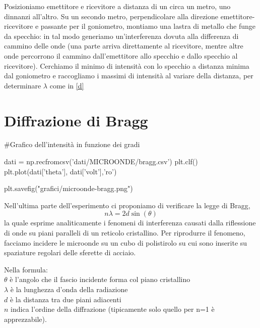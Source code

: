 Posizioniamo emettitore e ricevitore a distanza di un circa un metro, uno dinnanzi all'altro. Su un secondo metro, perpendicolare alla direzione emettitore-ricevitore e passante per il goniometro, montiamo una lastra di metallo che funge da specchio: in tal modo generiamo un'interferenza dovuta alla differenza di cammino delle onde (una parte arriva direttamente al ricevitore, mentre altre onde percorrono il cammino dall'emettitore allo specchio e dallo specchio al ricevitore). Cerchiamo il minimo di intensità con lo specchio a distanza minima dal goniometro e raccogliamo i massimi di intensità al variare della distanza, per determinare $\lambda$ come in \ref{d}

\begin{center}
\end{center}

\section{Diffrazione di Bragg}

\begin{sagesilent}
#Grafico dell'intensità in funzione dei gradi

dati = np.recfromcsv('dati/MICROONDE/bragg.csv')
plt.clf()
plt.plot(dati['theta'], dati['volt'],'ro')

plt.savefig("grafici/microonde-bragg.png")

\end{sagesilent}


Nell'ultima parte dell'esperimento ci proponiamo di verificare la legge di Bragg, 
\begin{equation}
n \lambda = 2 d \sin(\theta)
\end{equation}
la quale esprime analiticamente i fenomeni di interferenza causati dalla riflessione di onde su piani paralleli di un reticolo cristallino. Per riprodurre il fenomeno, facciamo incidere le microonde su un cubo di polistirolo su cui sono inserite su spaziature regolari delle sferette di acciaio.

Nella formula:\\
$\theta$ è l'angolo che il fascio incidente forma col piano cristallino\\
$\lambda$ è la lunghezza d'onda della radiazione\\
$d$ è la distanza tra due piani adiacenti\\
$n$ indica l'ordine della diffrazione (tipicamente solo quello per n=1 è apprezzabile).\\

